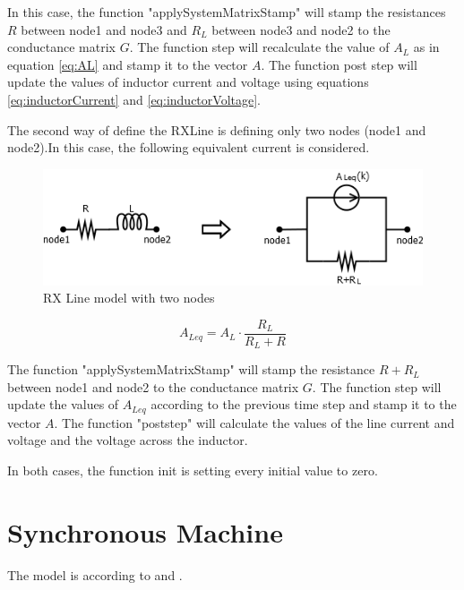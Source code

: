 In this case, the function "applySystemMatrixStamp" will stamp the resistances $R$ between node1 and node3 and $R_L$ between node3 and node2 to the conductance matrix $G$. The function step will recalculate the value of $A_L$ as in equation \ref{eq:AL} and stamp it to the vector $A$. The function post step will update the values of inductor current and voltage using equations \ref{eq:inductorCurrent} and \ref{eq:inductorVoltage}.

The second way of define the RXLine is defining only two nodes (node1 and node2).In this case, the following equivalent current is considered.

\begin{figure}[ht]
	\centering
	\includegraphics[scale=0.5]{img/RxLine2.png} 
	\caption{RX Line model with two nodes}
	\label{fig:RxLine2}
\end{figure}

\begin{equation}
A_{Leq}=A_L \cdot \frac{R_L}{R_L+R}
\end{equation}

The function "applySystemMatrixStamp" will stamp the resistance $R+R_L$ between node1 and node2 to the conductance matrix $G$. The function step will update the values of $A_{Leq}$ according to the previous time step and stamp it to the vector $A$.
The function "poststep" will calculate the values of the line current and voltage and the voltage across the inductor.

In both cases, the function init is setting every initial value to zero.
 
\section{Synchronous Machine}

The model is according to \cite{wang2010methods} and \cite{kundur1994power}. 

